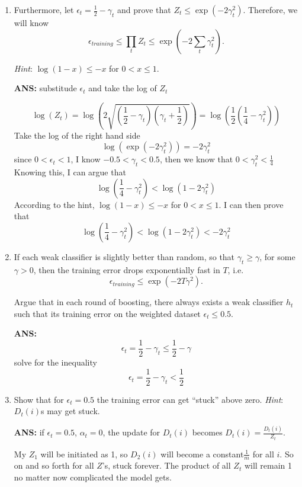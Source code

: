 \documentclass[english]{article}
\begin{document}
\begin{enumerate}
\item Furthermore, let $\epsilon_t=\frac{1}{2}-\gamma_t$
  and prove that $Z_t\leq \exp(-2\gamma_t^2)$.  Therefore, we will
  know
  \begin{equation*}
    \epsilon_{training} \le \prod_tZ_t \le
    \exp(-2\sum_t\gamma_t^2).
  \end{equation*}

  {\em Hint}: $\log(1-x)\leq -x$ for $0<x\leq 1$.
  
  {\bf ANS: } substitude $\epsilon_t$ and take the log of $Z_t$
  
  \[
  \log(Z_t) = \log(2\sqrt{(\frac{1}{2} - \gamma_t)(\gamma_t + \frac{1}{2})}) = \log(\frac{1}{2}(\frac{1}{4} - \gamma_t^2))
  \]
  Take the log of the right hand side
  \[
  \log(\exp(-2\gamma_t^2)) = -2\gamma_t^2 
  \]
  since $ 0 < \epsilon_t < 1$, I know $-0.5 < \gamma_t <0.5$, then we know that $0 < \gamma_t^2 < \frac{1}{4}$
  Knowing this, I can argue that
  \[
  \log(\frac{1}{4} - \gamma_t^2) < \log(1 - 2\gamma_t^2)
  \]
  According to the hint, $\log(1-x)\leq -x$ for $0<x\leq 1$. I can then prove that
  \[
 \log(\frac{1}{4} - \gamma_t^2) < \log(1-2\gamma_t^2) < -2\gamma_t^2
  \]

\item If each weak classifier is slightly better than
  random, so that $\gamma_t \ge \gamma$, for some $\gamma > 0$, then
  the training error drops exponentially fast in $T$, i.e.
  \[\epsilon_{training}\leq \exp(-2T\gamma^2).\]

  Argue that in each round of boosting, there always exists a weak
  classifier $h_t$ such that its training error on the weighted
  dataset $\epsilon_t \le 0.5$.
  
  {\bf ANS: }
  \[
  \epsilon_t = \frac{1}{2} - \gamma_t \le \frac{1}{2} - \gamma
  \]
  solve for the inequality
  \[
  \epsilon_t = \frac{1}{2} - \gamma_t < \frac{1}{2}
  \]


\item Show that for $\epsilon_t = 0.5$ the training error
  can get ``stuck'' above zero.  {\em Hint}: $D_t(i)$s may get stuck.
  

  {\bf ANS: }
if $\epsilon_t = 0.5$, $\alpha_t = 0$, the update for $D_t(i)$ becomes $D_t(i) = \frac{D_t(i)}{Z_t}$.

My $Z_1$ will be initiated as 1, so $D_2(i)$ will become a constant$\frac{1}{m}$ for all $i$. So on and so forth for all $Z$'s, stuck forever. The product of all $Z_t$ will remain 1 no matter now complicated the model gets.
  
\end{enumerate}
\end{document}
